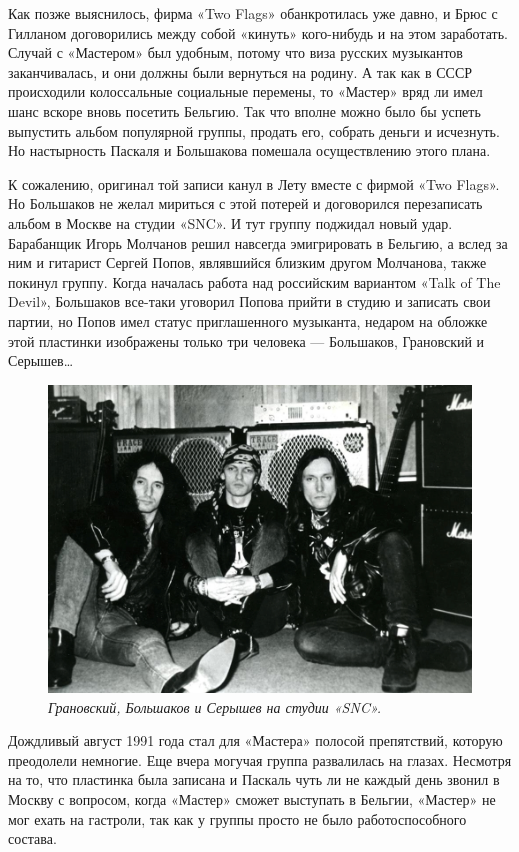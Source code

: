 \documentclass[16pt,a5paper,oneside]{book}
\begin{document}
Как позже выяснилось, фирма «Two Flags» обанкротилась уже давно, и Брюс с Гилланом договорились между собой «кинуть»
кого-нибудь и на этом заработать. Случай с «Мастером» был удобным, потому что виза русских музыкантов заканчивалась, и
они должны были вернуться на родину. А так как в СССР происходили колоссальные социальные перемены, то «Мастер» вряд ли
имел шанс вскоре вновь посетить Бельгию. Так что вполне можно было бы успеть выпустить альбом популярной группы, продать
его, собрать деньги и исчезнуть. Но настырность Паскаля и Большакова помешала осуществлению этого плана.

К сожалению, оригинал той записи канул в Лету вместе с фирмой «Two Flags». Но Большаков не желал мириться с этой потерей
и договорился перезаписать альбом в Москве на студии «SNC». И тут группу поджидал новый удар. Барабанщик Игорь Молчанов
решил навсегда эмигрировать в Бельгию, а вслед за ним и гитарист Сергей Попов, являвшийся близким другом Молчанова,
также покинул группу. Когда началась работа над российским вариантом «Talk of The Devil», Большаков все-таки уговорил
Попова прийти в студию и записать свои партии, но Попов имел статус приглашенного музыканта, недаром на обложке этой
пластинки изображены только три человека — Большаков, Грановский и Серышев\ldots

\begin{figure}
    \centering
    \includegraphics[scale=0.8]{Image27}
    \caption{\textit{Грановский, Большаков и Серышев на студии «SNC».}}
\end{figure}

Дождливый август 1991 года стал для «Мастера» полосой препятствий, которую преодолели немногие. Еще вчера могучая группа
развалилась на глазах. Несмотря на то, что пластинка была записана и Паскаль чуть ли не каждый день звонил в Москву с
вопросом, когда «Мастер» сможет выступать в Бельгии, «Мастер» не мог ехать на гастроли, так как у группы просто не было
работоспособного состава.
\end{document}
